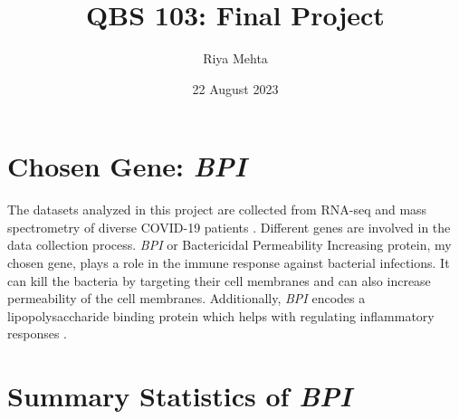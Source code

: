\documentclass{article}
\title{QBS 103: Final Project}
\author{Riya Mehta}
\date{22 August 2023}
\begin{document}
\maketitle

\tableofcontents

\newpage

\section{Chosen Gene: \emph{BPI}}
The datasets analyzed in this project are collected from RNA-seq and mass spectrometry of diverse COVID-19 patients \cite{Overmyer2021}. Different genes are involved in the data collection process. \emph{BPI} or Bactericidal Permeability Increasing protein, my chosen gene, plays a role in the immune response against bacterial infections. It can kill the bacteria by targeting their cell membranes and can also increase permeability of the cell membranes. Additionally, \emph{BPI} encodes a lipopolysaccharide binding protein which helps with regulating inflammatory responses \cite{NCBI}.

\section{Summary Statistics of \emph{BPI}}
\end{document}
